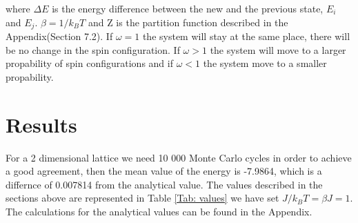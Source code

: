 \documentclass{article}
\begin{document}
\noindent where $\Delta E $ is the energy difference between the new and the previous state, $E_i$ and $E_j$. $\beta = 1/k_BT$ and Z is the partition function described in the Appendix(Section 7.2).
If $\omega = 1$ the system will stay at the same place, there will be no change in the spin configuration. If $\omega > 1$ the system will move to a larger propability of spin configurations and if $\omega < 1$ the system move to a smaller propability.

\section{Results}
For a 2 dimensional lattice we need 10 000 Monte Carlo cycles in order to achieve a good agreement, then the mean value of the energy is -7.9864, which is a differnce of 0.007814 from the analytical value. The values described in the sections above are represented in Table \ref{Tab: values} we have set $J/k_BT =\beta J = 1$. The calculations for the analytical values can be found in the Appendix.
\end{document}

